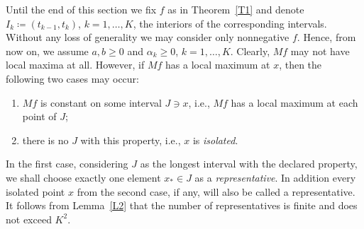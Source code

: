 \documentclass[leqno,11pt]{amsart}
\numberwithin{equation}{section}
\numberwithin{theorem}{section}
\begin{document}
	Until the end of this section we fix $f$ as in Theorem~\ref{T1} and denote $I_k \coloneqq (t_{k-1},t_k)$, $k=1,\ldots,K$, the interiors of the corresponding intervals.
	Without any loss of generality we may consider only nonnegative $f$. Hence, from now on, we assume $a,b\ge0$ and $\alpha_k\ge0$, $k=1,\ldots,K$. Clearly, $Mf$ may not have local maxima at all. However, if $Mf$ has a local maximum at $x$, then the following two cases may occur:
	\begin{enumerate}
		\item $Mf$ is constant on some interval $J \ni x$, i.e., $Mf$ has a local maximum at each point of $J$;
		\item there is no $J$ with this property, i.e., $x$ is \textit{isolated}.  
	\end{enumerate} 
	In the first case, considering $J$ as the longest interval with the declared property, we shall choose exactly one element $x_* \in J$ as a \emph{representative}. In addition every isolated point $x$ from the second case, if any, will also be called a representative. It follows from  Lemma~\ref{L2} that the number of representatives 
	is finite and does not exceed $K^2$. 
	 
\end{document}
